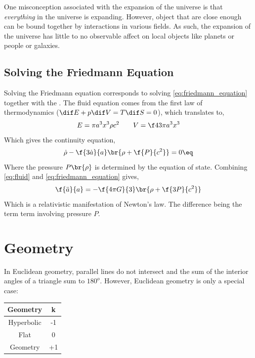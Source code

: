\documentclass{article}
\begin{document}
One misconception associated with the expansion of the universe is that \textit{everything} in the universe is expanding. However, object that are close enough can be bound together by interactions in various fields. As such, the expansion of the universe has little to no observable affect on local objects like planets or people or galaxies. \\

\subsection{Solving the Friedmann Equation}

Solving the Friedmann equation corresponds to solving \cref{eq:friedmann_equation} together with the . The fluid equation comes from the first law of thermodynamics ($\dif E + p \dif V = T \dif S = 0$), which translates to,
\[ E = \pi a^3 x^3 \rho c^2 \qquad V = \f43 \pi a^3 x^3 \]
Which gives the continuity equation,
\[ \dot{\rho} - \f{3\dot{a}}{a} \br{\rho + \f{P}{c^2}} = 0 \eq \label{eq:fluid}\]
Where the pressure $P\br{\rho}$ is determined by the equation of state. Combining \cref{eq:fluid} and \cref{eq:friedmann_equation} gives,
\[ \f{\ddot{a}}{a} = - \f{4 \pi G}{3} \br{\rho + \f{3P}{c^2}} \]
Which is a relativistic manifestation of Newton's law. The difference being the term term involving pressure $P$.

\section{Geometry}

In Euclidean geometry, parallel lines do not intersect and the sum of the interior angles of a triangle sum to $180^o$. However, Euclidean geometry is only a special case:

\begin{center}
\begin{tabular}{|c|c|}
    \hline
    Geometry & k \\
    \hline
    Hyperbolic & -1 \\
    Flat & 0 \\
    Geometry & +1 \\
    \hline
\end{tabular}
\end{center}
\end{document}
